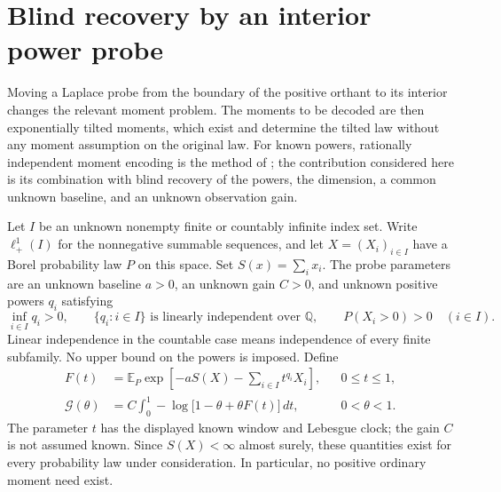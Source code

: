 \documentclass[11pt,letterpaper]{article}
\theoremstyle{definition}
\theoremstyle{remark}
\newcommand{\1}{\mathbf 1}
\begin{document}
\section{Blind recovery by an interior power probe}
\label{p08:sec:tempered-probe}

Moving a Laplace probe from the boundary of the positive orthant to
its interior changes the relevant moment problem. The moments to be
decoded are then exponentially tilted moments, which exist and determine
the tilted law without any moment assumption on the original law.
For known powers, rationally independent moment encoding is the method
of \cite[Lemmas~3.2--3.3]{Lenzi2026}; the contribution considered here is
its combination with blind recovery of the powers, the dimension, a
common unknown baseline, and an unknown observation gain.

Let $I$ be an unknown nonempty finite or countably infinite index set.
Write $\ell^1_+(I)$ for the nonnegative summable sequences, and let
$X=(X_i)_{i\in I}$ have a Borel probability law $P$ on this space. Set
$S(x)=\sum_i x_i$. The probe parameters are an unknown baseline $a>0$,
an unknown gain $C>0$, and unknown positive powers $q_i$ satisfying
\begin{equation}\label{p08:eq:temp-assumptions}
 \inf_{i\in I}q_i>0,\qquad
 \{q_i:i\in I\}\text{ is linearly independent over }\mathbb Q,
 \qquad P(X_i>0)>0\quad(i\in I).
\end{equation}
Linear independence in the countable case means independence of every
finite subfamily. No upper bound on the powers is imposed. Define
\begin{align}
 F(t)&=\mathbb E_P\exp\left[-aS(X)-\sum_{i\in I}t^{q_i}X_i\right],
                  &&0\leq t\leq1,\label{p08:eq:temp-F}\\
 \mathcal G(\theta)&=C\int_0^1
       -\log\bigl[1-\theta+\theta F(t)\bigr]\,dt,
                  &&0<\theta<1.\label{p08:eq:temp-G}
\end{align}
The parameter $t$ has the displayed known window and Lebesgue clock;
the gain $C$ is not assumed known. Since $S(X)<\infty$ almost surely,
these quantities exist for every probability law under consideration.
In particular, no positive ordinary moment need exist.
\end{document}
